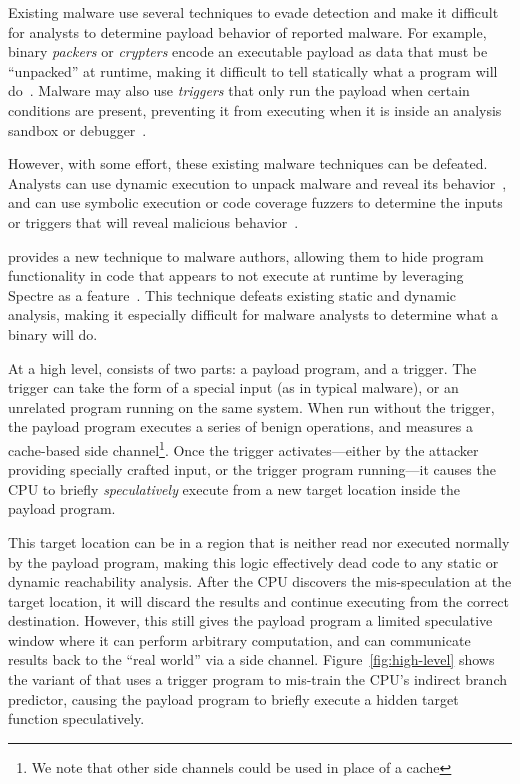 Existing malware use several techniques to evade detection and
make it difficult for analysts to determine payload behavior of reported malware. 
For example, binary \emph{packers} or \emph{crypters} encode an executable payload as
data that must be ``unpacked'' at runtime, making it difficult to tell
statically what a program will do~\cite{malware-packers}. Malware may also use
\emph{triggers} that only run the payload when certain conditions are present, preventing
it from executing when it is inside an analysis sandbox or 
debugger~\cite{balzarotti2010efficient,red-pill}.

However, with some effort, these existing malware techniques can be defeated.
Analysts can use
dynamic execution to unpack malware and reveal its
behavior~\cite{balzarotti2010efficient}, and can use symbolic execution or code
coverage fuzzers to determine the inputs or triggers that will reveal malicious
behavior~\cite{moser2007exploring,schwartz2010all,wang2017angr,egele2012survey}.


\speculake provides a new technique to malware authors, allowing them to hide
program functionality in code that appears to not execute at runtime by
leveraging Spectre as a feature~\cite{necessaryBlog}. This technique defeats
existing static and dynamic analysis, making it especially difficult for malware
analysts to determine what a binary will do.

\FigHighLevel

At a high level, \speculake consists of two parts: a payload program, and a
trigger. The trigger can take the form of a special input (as in typical
malware), or an unrelated program running on the same system. When run without
the trigger, the payload program executes a series of benign operations, and
measures a cache-based side channel\footnote{We note that other side channels
could be used in place of a cache}. Once the trigger activates---either
by the attacker providing specially crafted input, or the trigger program running---it causes
the CPU to briefly \emph{speculatively} execute from a new target location inside the
payload program.

This target location can be in a region that is neither read
nor executed normally by the payload program, making this logic effectively dead code to
any static or dynamic reachability analysis. After the CPU discovers the
mis-speculation at the target location, it will discard the results and continue
executing from the correct destination. However, this still gives the payload program a
limited speculative window where it can perform arbitrary computation, and can
communicate results back to the ``real world'' via a side
channel. Figure~\ref{fig:high-level} shows the variant of \speculake that uses a
trigger program to mis-train the CPU's indirect branch predictor, causing the
payload program to briefly execute a hidden target function speculatively.


